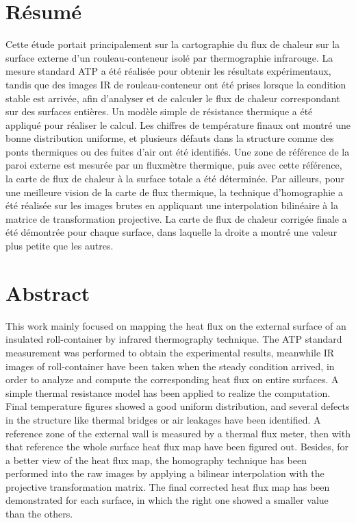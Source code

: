 \section*{Résumé}
Cette étude portait principalement sur la cartographie du flux de chaleur sur la surface externe d'un rouleau-conteneur isolé par thermographie infrarouge.
La mesure standard ATP a été réalisée pour obtenir les résultats expérimentaux, tandis que des images IR de rouleau-conteneur ont été prises lorsque la condition stable est arrivée, afin d'analyser et de calculer le flux de chaleur correspondant sur des surfaces entières. Un modèle simple de résistance thermique a été appliqué pour réaliser le calcul. Les chiffres de température finaux ont montré une bonne distribution uniforme, et plusieurs défauts dans la structure comme des ponts thermiques ou des fuites d'air ont été identifiés. Une zone de référence de la paroi externe est mesurée par un fluxmètre thermique, puis avec cette référence, la carte de flux de chaleur à la surface totale a été déterminée. Par ailleurs, pour une meilleure vision de la carte de flux thermique, la technique d'homographie a été réalisée sur les images brutes en appliquant une interpolation bilinéaire à la matrice de transformation projective. La carte de flux de chaleur corrigée finale a été démontrée pour chaque surface, dans laquelle la droite a montré une valeur plus petite que les autres.

\section*{Abstract}
This work mainly focused on mapping the heat flux on the external surface of an insulated roll-container by infrared thermography technique. The ATP standard measurement was performed to obtain the experimental results, meanwhile IR images of roll-container have been taken when the steady condition arrived, in order to analyze and compute the corresponding heat flux on entire surfaces. A simple thermal resistance model has been applied to realize the computation. Final temperature figures showed a good uniform distribution, and several defects in the structure like thermal bridges or air leakages have been identified. A reference zone of the external wall is measured by a thermal flux meter, then with that reference the whole surface heat flux map have been figured out. Besides, for a better view of the heat flux map, the homography technique has been performed into the raw images by applying a bilinear interpolation with the projective transformation matrix. The final corrected heat flux map has been demonstrated for each surface, in which the right one showed a smaller value than the others.


